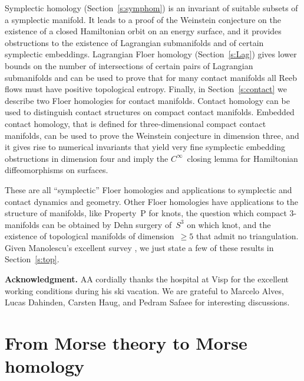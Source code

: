 \documentclass[12pt,twoside]{amsart}
\theoremstyle{plain}
\numberwithin{figure}{section}
\numberwithin{equation}{section}
\def\m{\medskip}
\def\ni{\noindent}
\def\m{\medskip}
\begin{document}
Symplectic homology (Section~\ref{s:symphom}) is an invariant of suitable subsets of a symplectic manifold.
It leads to a proof of the Weinstein conjecture on the existence of a closed Hamiltonian orbit on an energy surface, 
and it provides obstructions to the existence of Lagrangian submanifolds
and of certain symplectic embeddings.
%
Lagrangian Floer homology (Section~\ref{s:Lag}) gives lower bounds on the number of intersections of certain pairs of
Lagrangian submanifolds and can be used to prove that for many contact manifolds all Reeb flows must have 
positive topological entropy.
%
Finally, in Section~\ref{s:contact} we describe two Floer homologies for contact manifolds.
Contact homology can be used to distinguish contact structures on compact contact manifolds.
%
Embedded contact homology, that is defined for three-dimensional compact contact manifolds,
can be used to prove the Weinstein conjecture in dimension three, and it gives rise to numerical invariants 
that yield very fine symplectic embedding obstructions in dimension four 
and imply the $C^\infty$~closing lemma for Hamiltonian diffeomorphisms on surfaces.

These are all ``symplectic'' Floer homologies and applications to symplectic and contact
dynamics and geometry.
Other Floer homologies have applications to the structure of manifolds, 
like Property~P for knots, 
the question which compact 3-manifolds can be obtained by Dehn surgery of~$S^3$ on which knot,
and the existence of topological manifolds of dimension~$\geqslant 5$ that admit no triangulation. 
Given Manolescu's excellent survey \cite{Ma15}, we just state a few of these results in Section~\ref{s:top}.

%


\m \ni
{\bf Acknowledgment.}
AA cordially thanks the hospital at Visp for the excellent working conditions 
during his ski vacation.
We are grateful to Marcelo Alves, Lucas Dahinden, Carsten Haug, and Pedram Safaee for interesting discussions. 

\section{From Morse theory to Morse homology} \label{s:Morse}
\end{document}
